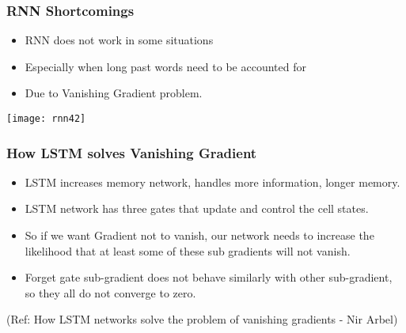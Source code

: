 


\begin{frame}[fragile] \frametitle{RNN Shortcomings}
\begin{itemize}
\item RNN does not work in some situations
\item Especially when long past words need to be accounted for
\item Due to Vanishing Gradient problem.
\end{itemize}

\begin{center}
\texttt{[image: rnn42]}
\end{center}
\end{frame}

\begin{frame}[fragile] \frametitle{How LSTM solves Vanishing Gradient}
\begin{itemize}
\item LSTM increases memory network, handles more information, longer memory.
\item LSTM network has three gates that update and control the cell states.
\item So if we want Gradient not to vanish, our network needs to increase the likelihood that at least some of these sub gradients will not vanish.
\item Forget gate sub-gradient does not behave similarly with other sub-gradient, so they all do not converge to zero.
\end{itemize}

{\tiny (Ref: How LSTM networks solve the problem of vanishing gradients
- Nir Arbel)}

\end{frame}

